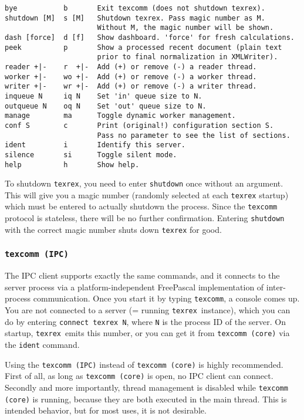 \documentclass[12pt,a4paper]{article}
\newenvironment{bx}
{
  \begin{center}
  \begin{boxedminipage}[h]{0.9\textwidth}
  \small
}
{
  \end{boxedminipage}
  \end{center}
}
\newcommand{\trthis}{\texttt{texrex}}
\begin{document}
\begin{bx}
{\scriptsize
\begin{verbatim}
bye           b       Exit texcomm (does not shutdown texrex).
shutdown [M]  s [M]   Shutdown texrex. Pass magic number as M.
                      Without M, the magic number will be shown.
dash [force]  d [f]   Show dashboard. 'force' for fresh calculations.
peek          p       Show a processed recent document (plain text
                      prior to final normalization in XMLWriter).
reader +|-    r  +|-  Add (+) or remove (-) a reader thread.
worker +|-    wo +|-  Add (+) or remove (-) a worker thread.
writer +|-    wr +|-  Add (+) or remove (-) a writer thread.
inqueue N     iq N    Set 'in' queue size to N.
outqueue N    oq N    Set 'out' queue size to N.
manage        ma      Toggle dynamic worker management.
conf S        c       Print (original!) configuration section S.
                      Pass no parameter to see the list of sections.
ident         i       Identify this server.
silence       si      Toggle silent mode.
help          h       Show help.
\end{verbatim}
}
\end{bx}

To shutdown \trthis, you need to enter \texttt{shutdown} once without an argument.
This will give you a magic number (randomly selected at each \texttt{texrex} startup) which must be entered to actually shutdown the process.
Since the \texttt{texcomm} protocol is stateless, there will be no further confirmation.
Entering \texttt{shutdown} with the correct magic number shuts down \texttt{texrex} for good.

\subsubsection{\texttt{texcomm (IPC)}}

The IPC client supports exactly the same commands, and it connects to the server process via a platform-independent FreePascal implementation of inter-process communication.
Once you start it by typing \texttt{texcomm}, a console comes up.
You are not connected to a server (= running \trthis\ instance), which you can do by entering \texttt{connect texrex N}, where \texttt{N} is the process ID of the server.
On startup, \trthis\ emits this number, or you can get it from \texttt{texcomm (core)} via the \texttt{ident} command.

Using the \texttt{texcomm (IPC)} instead of \texttt{texcomm (core)} is highly recommended.
First of all, as long as \texttt{texcomm (core)} is open, no IPC client can connect.
Secondly and more importantly, thread management is disabled while \texttt{texcomm (core)} is running, because they are both executed in the main thread.
This is intended behavior, but for most uses, it is not desirable.
\end{document}

